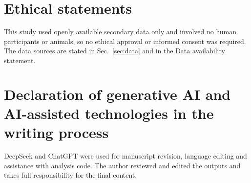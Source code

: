 \documentclass[preprint,11pt,authoryear]{elsarticle}
\begin{document}
\section*{Ethical statements}
This study used openly available secondary data only and involved no human participants or animals, so no ethical approval or informed consent was required. The data sources are stated in Sec.~\ref{sec:data} and in the Data availability statement.

\section*{Declaration of generative AI and AI-assisted technologies in the writing process}
DeepSeek and ChatGPT were used for manuscript revision, language editing and assistance with analysis code. The author reviewed and edited the outputs and takes full responsibility for the final content.



\end{document}
